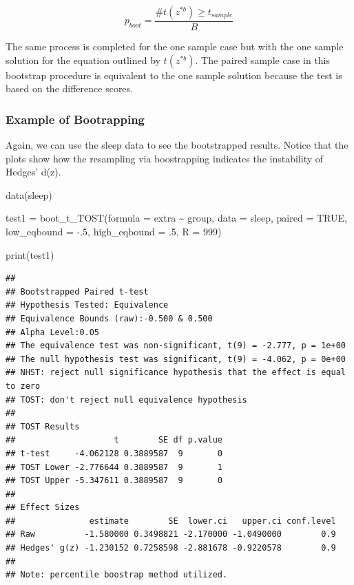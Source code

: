 \documentclass[]{interact}
\theoremstyle{plain}%
\theoremstyle{definition}
\theoremstyle{remark}
\newenvironment{Shaded}{\begin{snugshade}}{\end{snugshade}}
\newcommand{\AttributeTok}[1]{\textcolor[rgb]{0.77,0.63,0.00}{#1}}
\newcommand{\ConstantTok}[1]{\textcolor[rgb]{0.00,0.00,0.00}{#1}}
\newcommand{\DecValTok}[1]{\textcolor[rgb]{0.00,0.00,0.81}{#1}}
\newcommand{\FunctionTok}[1]{\textcolor[rgb]{0.00,0.00,0.00}{#1}}
\newcommand{\NormalTok}[1]{#1}
\newcommand{\OtherTok}[1]{\textcolor[rgb]{0.56,0.35,0.01}{#1}}
\newcommand{\SpecialCharTok}[1]{\textcolor[rgb]{0.00,0.00,0.00}{#1}}
\newcommand{\StringTok}[1]{\textcolor[rgb]{0.31,0.60,0.02}{#1}}
\begin{document}
\[
p_{boot} = \frac {\#t(z^{*b}) \ge t_{sample}}{B}
\]

The same process is completed for the one sample case but with the one
sample solution for the equation outlined by \(t(z^{*b})\). The paired
sample case in this bootstrap procedure is equivalent to the one sample
solution because the test is based on the difference scores.

\hypertarget{example-of-bootrapping}{%
\subsubsection{Example of Bootrapping}\label{example-of-bootrapping}}

Again, we can use the sleep data to see the bootstrapped results. Notice
that the plots show how the resampling via boostrapping indicates the
instability of Hedges' d(z).

\begin{Shaded}
\begin{Highlighting}[]
\FunctionTok{data}\NormalTok{(}\StringTok{\textquotesingle{}sleep\textquotesingle{}}\NormalTok{)}

\NormalTok{test1 }\OtherTok{=} \FunctionTok{boot\_t\_TOST}\NormalTok{(}\AttributeTok{formula =}\NormalTok{ extra }\SpecialCharTok{\textasciitilde{}}\NormalTok{ group,}
                    \AttributeTok{data =}\NormalTok{ sleep,}
                    \AttributeTok{paired =} \ConstantTok{TRUE}\NormalTok{,}
                    \AttributeTok{low\_eqbound =} \SpecialCharTok{{-}}\NormalTok{.}\DecValTok{5}\NormalTok{,}
                    \AttributeTok{high\_eqbound =}\NormalTok{ .}\DecValTok{5}\NormalTok{,}
                    \AttributeTok{R =} \DecValTok{999}\NormalTok{)}


\FunctionTok{print}\NormalTok{(test1)}
\end{Highlighting}
\end{Shaded}

\begin{verbatim}
## 
## Bootstrapped Paired t-test
## Hypothesis Tested: Equivalence
## Equivalence Bounds (raw):-0.500 & 0.500
## Alpha Level:0.05
## The equivalence test was non-significant, t(9) = -2.777, p = 1e+00
## The null hypothesis test was significant, t(9) = -4.062, p = 0e+00
## NHST: reject null significance hypothesis that the effect is equal to zero 
## TOST: don't reject null equivalence hypothesis
## 
## TOST Results 
##                    t        SE df p.value
## t-test     -4.062128 0.3889587  9       0
## TOST Lower -2.776644 0.3889587  9       1
## TOST Upper -5.347611 0.3889587  9       0
## 
## Effect Sizes 
##               estimate        SE  lower.ci   upper.ci conf.level
## Raw          -1.580000 0.3498821 -2.170000 -1.0490000        0.9
## Hedges' g(z) -1.230152 0.7258598 -2.881678 -0.9220578        0.9
## 
## Note: percentile boostrap method utilized.
\end{verbatim}
\end{document}
